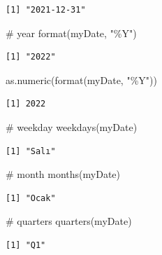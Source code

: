 \documentclass[
  letterpaper,
  DIV=11,
  numbers=noendperiod]{scrreprt}
\newenvironment{Shaded}{\begin{snugshade}}{\end{snugshade}}
\newcommand{\CommentTok}[1]{\textcolor[rgb]{0.37,0.37,0.37}{#1}}
\newcommand{\FunctionTok}[1]{\textcolor[rgb]{0.28,0.35,0.67}{#1}}
\newcommand{\NormalTok}[1]{\textcolor[rgb]{0.00,0.23,0.31}{#1}}
\newcommand{\StringTok}[1]{\textcolor[rgb]{0.13,0.47,0.30}{#1}}
\begin{document}
\begin{verbatim}
[1] "2021-12-31"
\end{verbatim}

\begin{Shaded}
\begin{Highlighting}[]
\CommentTok{\# year}
\FunctionTok{format}\NormalTok{(myDate, }\StringTok{"\%Y"}\NormalTok{)}
\end{Highlighting}
\end{Shaded}

\begin{verbatim}
[1] "2022"
\end{verbatim}

\begin{Shaded}
\begin{Highlighting}[]
\FunctionTok{as.numeric}\NormalTok{(}\FunctionTok{format}\NormalTok{(myDate, }\StringTok{"\%Y"}\NormalTok{))}
\end{Highlighting}
\end{Shaded}

\begin{verbatim}
[1] 2022
\end{verbatim}

\begin{Shaded}
\begin{Highlighting}[]
\CommentTok{\# weekday}
\FunctionTok{weekdays}\NormalTok{(myDate)}
\end{Highlighting}
\end{Shaded}

\begin{verbatim}
[1] "Salı"
\end{verbatim}

\begin{Shaded}
\begin{Highlighting}[]
\CommentTok{\# month}
\FunctionTok{months}\NormalTok{(myDate)}
\end{Highlighting}
\end{Shaded}

\begin{verbatim}
[1] "Ocak"
\end{verbatim}

\begin{Shaded}
\begin{Highlighting}[]
\CommentTok{\# quarters}
\FunctionTok{quarters}\NormalTok{(myDate)}
\end{Highlighting}
\end{Shaded}

\begin{verbatim}
[1] "Q1"
\end{verbatim}
\end{document}
